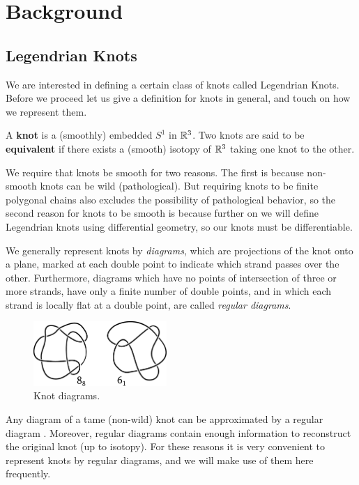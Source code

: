 \chapter{Background}
\section{Legendrian Knots}

We are interested in defining a certain class of knots called Legendrian Knots. Before we proceed let us give a definition for knots in general, and touch on how we represent them.

\begin{definition}
    A \textbf{knot} is a (smoothly) embedded $S^1$ in $\mathbb{R}^3$. Two knots are said to be \textbf{equivalent} if there exists a (smooth) isotopy of $\mathbb{R}^3$ taking one knot to the other.
\end{definition}
We require that knots be smooth for two reasons. The first is because non-smooth knots can be wild (pathological).
But requiring knots to be finite polygonal chains also excludes the possibility of pathological behavior, so the second reason for knots to be smooth is because further on we will define Legendrian knots using differential geometry, so our knots must be differentiable. 

We generally represent knots by \emph{diagrams}, which are projections of the knot onto a plane, marked at each double point to indicate which strand passes over the other.
Furthermore, diagrams which have no points of intersection of three or more strands, have only a finite number of double points, and in which each strand is locally flat at a double point, are called \emph{regular diagrams}.

\begin{figure}[ht]
    \centering
    \includegraphics[width=0.45\textwidth]{images/smooth-knots.pdf}
    \caption{Knot diagrams.}%
    \label{fig:diagrams}
\end{figure}

Any diagram of a tame (non-wild) knot can be approximated by a regular diagram \cite{murasugi1996}.
Moreover, regular diagrams contain enough information to reconstruct the original knot (up to isotopy). For these reasons it is very convenient to represent knots by regular diagrams, and we will make use of them here frequently.

